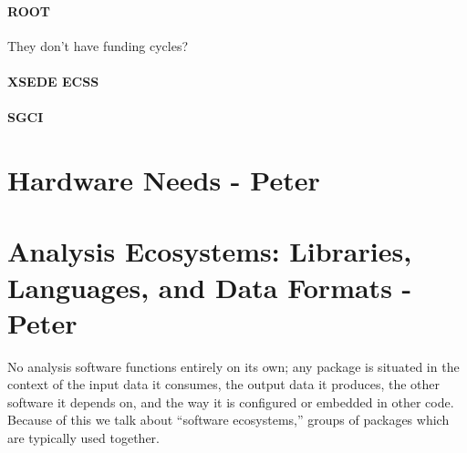 \paragraph{ROOT}
They don't have funding cycles?

\paragraph{XSEDE ECSS}

\paragraph{SGCI}


\section{Hardware Needs - Peter}

\section{Analysis Ecosystems: Libraries, Languages, and Data Formats - Peter}
No analysis software functions entirely on its own; any package is situated in the context of the input data it consumes, the output data it produces, the other software it depends on, and the way it is configured or embedded in other code. Because of this we talk about ``software ecosystems,'' groups of packages which are typically used together.

